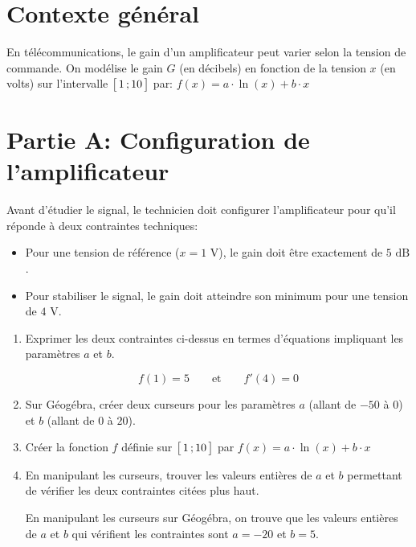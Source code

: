 \documentclass[11pt, a4paper]{report}
\begin{document}
\def\level{BTS}  %
\def\course{CIEL 1}
\def\chaptername{02} %
\def\docname{CCF Blanc}        %

\pagestyle{DS_FP}

\NomPrenomNote{}


\section*{Contexte général}

En télécommunications, le gain d'un amplificateur peut varier selon la tension de commande. On modélise le gain $G$ (en décibels) en fonction de la tension $x$ (en volts) sur l'intervalle $\bigl[ \, 1 \, ; 10 \,\bigl]$ par:
$f(x) = a \cdot \ln(x) + b \cdot x$

\section*{Partie A\@: Configuration de l'amplificateur}

Avant d'étudier le signal, le technicien doit configurer l'amplificateur pour qu'il réponde à deux contraintes techniques:

\begin{itemize}
    \item Pour une tension  de référence ($x = 1\text{ V}$), le gain doit être exactement de $5\text{ dB}$.
    \item Pour stabiliser le signal, le gain doit atteindre son minimum pour une tension de $4\text{ V}$.
\end{itemize}

\medskip

\begin{enumerate}
    \item Exprimer les deux contraintes ci-dessus en termes d'équations impliquant les paramètres $a$ et $b$.
    \begin{blocvisible}[height=1]
        \[ f(1) = 5 \qquad \text{et} \qquad      f'(4) = 0\]
    \end{blocvisible}
    \item Sur Géogébra, créer deux curseurs pour les paramètres $a$ (allant de $-50$ à $0$) et $b$ (allant de $0$ à $20$).
    \item Créer la fonction $f$ définie sur $\bigl[ \, 1 \, ; 10 \,\bigl]$ par $f(x)=a \cdot \ln(x)+b\cdot x$
    \item En manipulant les curseurs, trouver les valeurs entières de $a$ et $b$ permettant de vérifier les deux contraintes citées plus haut.
    \begin{blocvisible}[height=1.5]
        En manipulant les curseurs sur Géogébra, on trouve que les valeurs entières de $a$ et $b$ qui vérifient les contraintes sont $a = -20$ et $b = 5$.
    \end{blocvisible}
    \appelprof{}
\end{enumerate}
\end{document}
